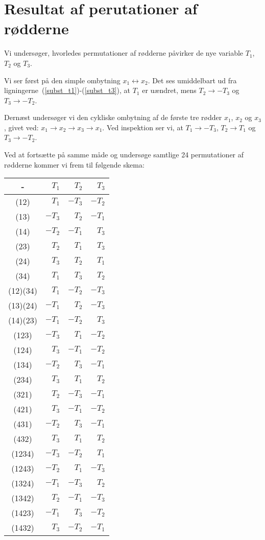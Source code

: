 \documentclass[12pt,oneside,a4paper]{article}
\begin{document}
\section{Resultat af perutationer af rødderne}
Vi undersøger, hvorledes permutationer af rødderne påvirker de nye variable
$T_1$, $T_2$ og $T_3$.

Vi ser først på den simple ombytning $x_1 \leftrightarrow x_2$. Det ses
umiddelbart ud fra ligningerne~(\ref{subst_t1})-(\ref{subst_t3}), at $T_1$ er uændret, mens $T_2 \rightarrow -T_3$ og $T_3 \rightarrow -T_2$.

Dernæst undersøger vi den cykliske ombytning af de første tre rødder $x_1$,
$x_2$ og $x_3$, givet ved: $x_1 \rightarrow x_2 \rightarrow x_3 \rightarrow
x_1$.  Ved inspektion ser vi, at $T_1 \rightarrow -T_3$, $T_2 \rightarrow T_1$
og $T_3 \rightarrow -T_2$.

Ved at fortsætte på samme måde og undersøge samtlige 24 permutationer af
rødderne kommer vi frem til følgende skema:

\begin{tabular}{|c|r|r|r|}
    \hline 
    -    & $ T_1$ & $ T_2$ & $ T_3$ \\
    \hline 
    (12) & $ T_1$ & $-T_3$ & $-T_2$ \\
    (13) & $-T_3$ & $ T_2$ & $-T_1$ \\
    (14) & $-T_2$ & $-T_1$ & $ T_3$ \\
    (23) & $ T_2$ & $ T_1$ & $ T_3$ \\
    (24) & $ T_3$ & $ T_2$ & $ T_1$ \\
    (34) & $ T_1$ & $ T_3$ & $ T_2$ \\
    \hline 
    (12)(34) & $ T_1$ & $-T_2$ & $-T_3$ \\
    (13)(24) & $-T_1$ & $ T_2$ & $-T_3$ \\
    (14)(23) & $-T_1$ & $-T_2$ & $ T_3$ \\
    \hline 
    (123) & $-T_3$ & $ T_1$ & $-T_2$ \\
    (124) & $ T_3$ & $-T_1$ & $-T_2$ \\
    (134) & $-T_2$ & $ T_3$ & $-T_1$ \\
    (234) & $ T_3$ & $ T_1$ & $ T_2$ \\
    (321) & $ T_2$ & $-T_3$ & $-T_1$ \\
    (421) & $ T_3$ & $-T_1$ & $-T_2$ \\
    (431) & $-T_2$ & $ T_3$ & $-T_1$ \\
    (432) & $ T_3$ & $ T_1$ & $ T_2$ \\
    \hline 
    (1234) & $-T_3$ & $-T_2$ & $ T_1$ \\
    (1243) & $-T_2$ & $ T_1$ & $-T_3$ \\
    (1324) & $-T_1$ & $-T_3$ & $ T_2$ \\
    (1342) & $ T_2$ & $-T_1$ & $-T_3$ \\
    (1423) & $-T_1$ & $ T_3$ & $-T_2$ \\
    (1432) & $ T_3$ & $-T_2$ & $-T_1$ \\
    \hline
\end{tabular}
\end{document}
